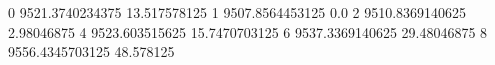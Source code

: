 0 9521.3740234375 13.517578125
1 9507.8564453125 0.0
2 9510.8369140625 2.98046875
4 9523.603515625 15.7470703125
6 9537.3369140625 29.48046875
8 9556.4345703125 48.578125
